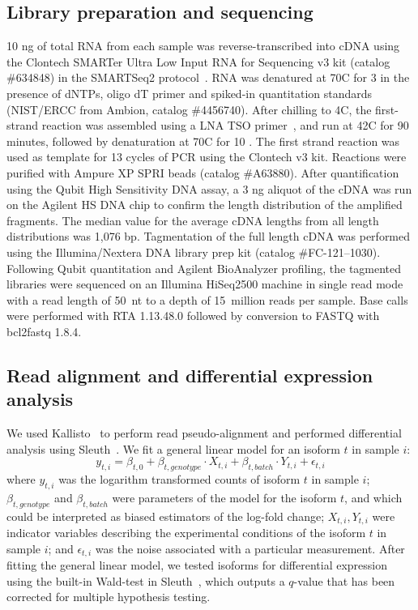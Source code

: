 \documentclass[9pt,twocolumn,twoside]{pnas-new}
\begin{document}
{\subsection*{Library preparation and sequencing}
10 \si{\nano\gram} of total RNA from each sample was
reverse-transcribed into cDNA using the Clontech SMARTer Ultra Low Input RNA for
Sequencing v3 kit (catalog \#634848) in the SMARTSeq2
protocol~\cite{Picelli2014}.  RNA was denatured at 70\degree{}C for 3 \si{\min}
in the presence of dNTPs, oligo dT primer and spiked-in quantitation standards
(NIST/ERCC from Ambion, catalog \#4456740). After chilling to 4\degree{}C, the
first-strand reaction was assembled using a LNA TSO primer~\cite{Picelli2014},
and run at 42\degree{}C for 90 minutes, followed by denaturation at
70\degree{}C for 10 \si{\min}.  The first
strand reaction was used as template for 13 cycles of PCR using the
Clontech v3 kit. Reactions were purified with Ampure XP SPRI
beads (catalog \#A63880).  After
quantification using the Qubit High Sensitivity DNA assay, a 3 \si{\nano\gram}
aliquot of the cDNA was run on the Agilent HS DNA chip to confirm the
length distribution of the amplified fragments. The median value for the
average cDNA lengths from all length distributions was 1,076 bp.  Tagmentation
of the full length cDNA was performed using the Illumina/Nextera
DNA library prep kit (catalog \#FC-121--1030). Following Qubit quantitation and
Agilent BioAnalyzer profiling, the tagmented libraries were sequenced on
an Illumina HiSeq2500 machine in single read mode with a read length of
50~nt to a depth of 15~million reads per sample. Base calls were performed with
RTA 1.13.48.0 followed by conversion to FASTQ with bcl2fastq 1.8.4.

\subsection*{Read alignment and differential expression analysis}
We used Kallisto~\cite{Bray2016} to perform read pseudo-alignment and performed
differential analysis using Sleuth~\cite{Pimentel2016}. We fit a general linear
model for an isoform $t$ in sample $i$:
\begin{equation}
  y_{t,i} = \beta_{t, 0} + \beta_{t, genotype}\cdot{}X_{t, i} +
  \beta_{t, batch}\cdot{}Y_{t, i} + \epsilon_{t, i}
\end{equation}
where $y_{t, i}$ was the logarithm transformed counts of isoform $t$ in sample
$i$; $\beta_{t, genotype}$ and $\beta_{t, batch}$ were parameters of the model
for the isoform $t$, and which could be interpreted as biased estimators of the
log-fold change; $X_{t, i}, Y_{t, i}$ were indicator variables describing the
experimental conditions of the isoform $t$ in sample $i$; and $\epsilon_{t, i}$
was the noise associated with a particular measurement.
\color{purple}
After fitting the
general linear model, we tested isoforms for differential expression using the
built-in Wald-test in Sleuth~\cite{Pimentel2016}, which outputs a $q$-value that
has been corrected for multiple hypothesis testing.
\color{black}

}
\end{document}

